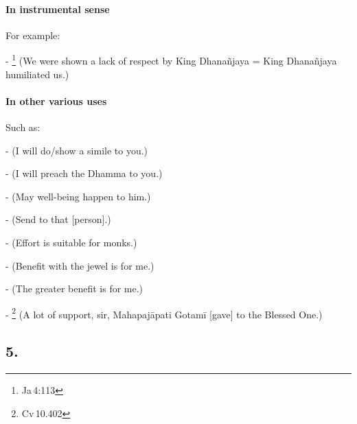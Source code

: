 \paragraph*{In instrumental sense} For example:\par
- \footnote{Ja\,4:113} (We were shown a lack of respect by King Dhana\~njaya = King Dhana\~njaya humiliated us.)\par

\paragraph*{In other various uses} Such as:\par
-  (I will do/show a simile to you.)\par
-  (I will preach the Dhamma to you.)\par
-  (May well-being happen to him.)\par
-  (Send to that [person].)\par
-  (Effort is suitable for monks.)\par
-  (Benefit with the jewel is for me.)\par
-  (The greater benefit is for me.)\par
- \footnote{Cv\,10.402} (A lot of support, sir, Mahapaj\=apati Gotam\=i [gave] to the Blessed One.)\par

{}
\subsection*{5.\,}

